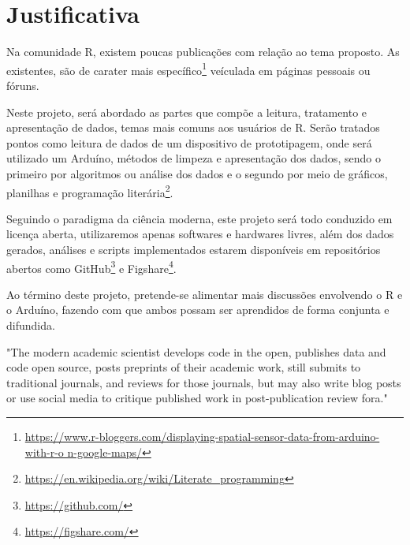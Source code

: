 \chapter[Justificativa]{Justificativa}

Na comunidade R, existem poucas publicações com relação ao tema proposto. As 
existentes, são de carater mais 
específico\footnote{\url{
https://www.r-bloggers.com/displaying-spatial-sensor-data-from-arduino-with-r-o
n-google-maps/}} veículada em páginas pessoais ou fóruns. 

Neste projeto, será abordado as partes que compõe a leitura, tratamento e 
apresentação de dados, temas mais comuns aos usuários de R. Serão tratados 
pontos como leitura de dados de um dispositivo de prototipagem, onde será 
utilizado um Arduíno, métodos de limpeza e apresentação dos dados, sendo o 
primeiro por 
algoritmos ou análise dos dados e o segundo por meio de gráficos, planilhas e 
programação 
literária\footnote{\url{https://en.wikipedia.org/wiki/Literate_programming}}.

Seguindo o paradigma da ciência moderna, este projeto será todo conduzido em 
licença aberta, utilizaremos apenas softwares e hardwares livres, além dos 
dados 
gerados, análises e scripts implementados estarem disponíveis em repositórios 
abertos como GitHub\footnote{\url{https://github.com/}} e 
Figshare\footnote{\url{https://figshare.com/}}.

Ao término deste projeto, pretende-se alimentar mais discussões envolvendo o R e o 
Arduíno, fazendo com que ambos possam ser aprendidos de forma conjunta e 
difundida. 

\begin{citacao}[english]
  "The modern academic scientist develops code in the open, publishes data and 
code open source, posts preprints of their academic work, still submits to 
traditional journals, and reviews for those journals, but may also write blog 
posts or use social media to critique published work in post-publication review 
fora."\cite{Peng2015}
\end{citacao}


